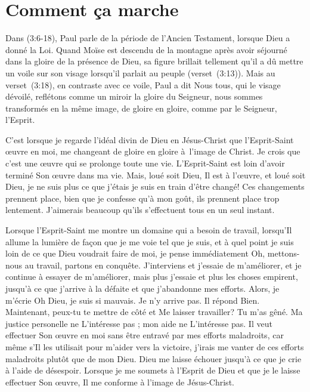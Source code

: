\section{Comment \c{c}a marche}

Dans (3:6-18), Paul parle de la période
 de l'Ancien Testament, lorsque Dieu a donné la Loi.
 Quand Moïse est descendu de la montagne après avoir séjourné
 dans la gloire de la présence de Dieu,
 sa figure brillait tellement qu'il a dû mettre un voile sur son visage
 lorsqu'il parlait au peuple (verset~(3:13)).
 Mais au verset~(3:18), en contraste avec ce voile,
 Paul a dit\frcolon{}
 \Og Nous tous, qui le visage dévoilé, reflétons comme un miroir
 la gloire du Seigneur, nous sommes transformés en la même image,
 de gloire en gloire, comme par le Seigneur,
 l'Esprit. \Fg{}

C'est lorsque je regarde l'idéal divin de Dieu en Jésus-Christ
 que l'Esprit-Saint œuvre en moi, me changeant de gloire en gloire
 à~l'image de Christ.
 Je crois que c'est une œuvre qui se prolonge toute une vie.
 L'Es\-prit-Saint est loin d'avoir terminé Son œuvre dans ma vie.
 Mais, loué soit Dieu, Il est à l'œuvre, et loué soit Dieu,
 je ne suis plus ce que j'étais
 \ocadr je suis en train d'être changé!
 Ces changements prennent place, bien que je confesse qu'à mon goût, ils prennent place
 trop lentement.
 J'aimerais beaucoup qu'ils s'effectuent tous en un seul instant.

Lorsque l'Esprit-Saint me montre un domaine qui a besoin de travail,
 lorsqu'Il allume la lumière de façon que je me voie tel que je suis,
 et à quel point je suis loin de ce que Dieu voudrait faire de moi,
 je pense immédiatement\frcolon{}
 \Og Oh, mettons-nous au travail, partons en conquête. \Fg{}
 J'interviens et j'essaie de m'améliorer,
 et je continue à essayer de m'améliorer,
 mais plus j'essaie et plus les choses empirent,
 jusqu'à ce que j'arrive à la défaite et que j'abandonne mes efforts.
 Alors, je m'écrie\frcolon{}
 \Og Oh Dieu, je suis si mauvais. Je n'y arrive pas. \Fg{}
 Il répond\frcolon{}
 \Og Bien. Maintenant, peux-tu te mettre de côté et Me laisser travailler?
 Tu m'as gêné. \Fg{}
 Ma justice personelle ne L'intéresse pas ;
 mon aide ne L'intéresse pas.
 Il veut effectuer Son œuvre en moi sans être entravé
 par mes efforts maladroits,
 car même s'Il les utilisait
 pour m'aider vers la victoire,
 j'irais me vanter de ces efforts maladroits plutôt que de mon Dieu.
 Dieu me laisse échouer jusqu'à ce que je crie à l'aide de désespoir.
 Lorsque je me soumets à l'Esprit de Dieu et que je le laisse
 effectuer Son œuvre, Il me conforme à l'image de Jésus-Christ.


